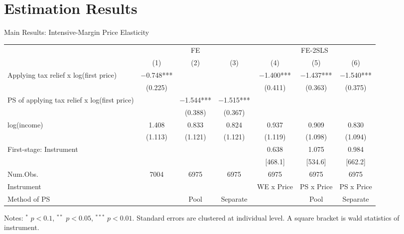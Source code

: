 \documentclass[
  ignorenonframetext,
  aspectratio=169,
]{beamer}
\begin{document}
\hypertarget{result}{%
\section{Estimation Results}\label{result}}

\begin{frame}{Main Results: Intensive-Margin Price Elasticity}
\protect\hypertarget{main-results-intensive-margin-price-elasticity}{}
\begin{table}
\centering
\fontsize{8}{10}\selectfont
\begin{threeparttable}
\begin{tabular}[t]{>{\raggedright\arraybackslash}p{10em}cccccc}
\toprule
\multicolumn{1}{c}{ } & \multicolumn{3}{c}{FE} & \multicolumn{3}{c}{FE-2SLS} \\
\cmidrule(l{3pt}r{3pt}){2-4} \cmidrule(l{3pt}r{3pt}){5-7}
  & (1) & (2) & (3) & (4) & (5) & (6)\\
\midrule
Applying tax relief x log(first price) & \num{-0.748}*** &  &  & \num{-1.400}*** & \num{-1.437}*** & \num{-1.540}***\\
 & (\num{0.225}) &  &  & (\num{0.411}) & (\num{0.363}) & (\num{0.375})\\
PS of applying tax relief x log(first price) &  & \num{-1.544}*** & \num{-1.515}*** &  &  & \\
 &  & (\num{0.388}) & (\num{0.367}) &  &  & \\
log(income) & \num{1.408} & \num{0.833} & \num{0.824} & \num{0.937} & \num{0.909} & \num{0.830}\\
 & (\num{1.113}) & (\num{1.121}) & (\num{1.121}) & (\num{1.119}) & (\num{1.098}) & (\num{1.094})\\
\midrule
First-stage: Instrument &  &  &  & 0.638 & 1.075 & 0.984\\
 &  &  &  & {}[468.1] & {}[534.6] & {}[662.2]\\
Num.Obs. & \num{7004} & \num{6975} & \num{6975} & \num{6975} & \num{6975} & \num{6975}\\
Instrument &  &  &  & WE x Price & PS x Price & PS x Price\\
Method of PS &  & Pool & Separate &  & Pool & Separate\\
\bottomrule
\end{tabular}
\begin{tablenotes}
\item Notes: $^{*}$ $p < 0.1$, $^{**}$ $p < 0.05$, $^{***}$ $p < 0.01$. Standard errors are clustered at individual level. A square bracket is wald statistics of instrument.
\end{tablenotes}
\end{threeparttable}
\end{table}
\end{frame}
\end{document}

